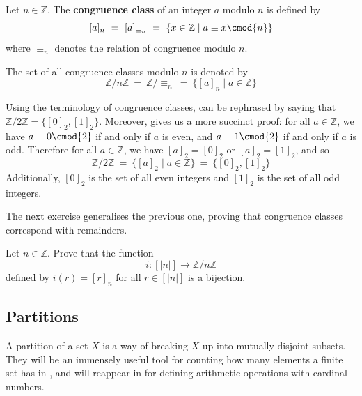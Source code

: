 \begin{definition}
\label{defCongruenceClass}
Let $n \in \mathbb{Z}$. The \textbf{congruence class} of an integer $a$ modulo $n$ is defined by
\[ [a]_n ~=~ [a]_{\equiv_n} ~=~ \{ x \in \mathbb{Z} \mid a \equiv x \cmod{n} \} \]
where $\equiv_n$ denotes the relation of congruence modulo $n$.

The set of all congruence classes modulo $n$ is denoted by
\[ \mathbb{Z}/n\mathbb{Z} ~=~ \mathbb{Z}/{\equiv_n} ~=~ \{ [a]_n \mid a \in \mathbb{Z} \} \]
\end{definition}

\begin{example}
Using the terminology of congruence classes,  can be rephrased by saying that $\mathbb{Z}/2\mathbb{Z} = \{ [0]_2, [1]_2 \}$. Moreover,  gives us a more succinct proof: for all $a \in \mathbb{Z}$, we have $a \equiv 0 \cmod{2}$ if and only if $a$ is even, and $a \equiv 1 \cmod{2}$ if and only if $a$ is odd. Therefore for all $a \in \mathbb{Z}$, we have $[a]_2 = [0]_2$ or $[a]_2 = [1]_2$, and so
\[ \mathbb{Z}/2\mathbb{Z} ~=~ \{ [a]_2 \mid a \in \mathbb{Z} \} ~=~ \{ [0]_2, [1]_2 \} \]
Additionally, $[0]_2$ is the set of all even integers and $[1]_2$ is the set of all odd integers.
\end{example}

The next exercise generalises the previous one, proving that congruence classes correspond with remainders.

\begin{exercise}
\label{exCongruenceClassesCorrespondWithRemainders}
Let $n \in \mathbb{Z}$. Prove that the function
\[ i : [|n|] \to \mathbb{Z}/n\mathbb{Z} \]
defined by $i(r) = [r]_n$ for all $r \in [|n|]$ is a bijection.
\end{exercise}

\subsection*{Partitions}

A partition of a set $X$ is a way of breaking $X$ up into mutually disjoint subsets. They will be an immensely useful tool for counting how many elements a finite set has in , and will reappear in  for defining arithmetic operations with cardinal numbers.

